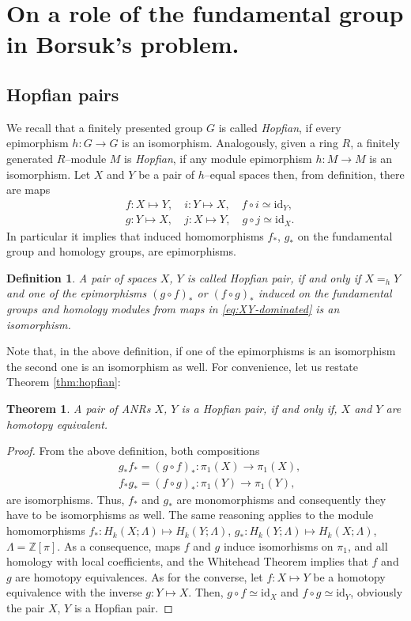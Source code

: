 \documentclass[reqno,12pt]{amsart}
\newtheorem*{theorem*}{Theorem}
\theoremstyle{ourremark}
\newtheorem{definition}[theorem]{Definition}
\numberwithin{equation}{section}
\numberwithin{theorem}{section}
\begin{document}
\section{On a role of the fundamental group in Borsuk's problem.}\label{sec:pi_1-role}

\subsection{Hopfian pairs} We recall that a finitely presented group $G$ is called {\em Hopfian}, if every epimorphism $h:G\longrightarrow G$ is an isomorphism.
Analogously, given a ring $R$, a finitely generated $R$--module $M$ is {\em Hopfian}, if any module epimorphism $h:M\longrightarrow M$ is an 
isomorphism. Let $X$ and $Y$ be a pair of $h$--equal spaces then, from definition, there are maps 
\begin{equation}\label{eq:XY-dominated}
\begin{split}
 & f:X\longmapsto Y,\quad i:Y\longmapsto X,\quad f\circ i\simeq \text{id}_Y,\\
 & g:Y\longmapsto X, \quad j:X\longmapsto Y, \quad g\circ j\simeq \text{id}_X.
\end{split} 
\end{equation}
In particular it implies that induced homomorphisms $f_\ast$, $g_\ast$ on the fundamental group and homology groups, are epimorphisms.
\begin{definition}\label{def:hopfian}
A pair of spaces $X$, $Y$ is called {\em Hopfian pair}, if and only if $X=_h Y$ and one of the epimorphisms $(g\circ f)_*$ or $(f\circ g)_*$ induced on the fundamental groups and homology modules from maps in \eqref{eq:XY-dominated} is an isomorphism.
\end{definition}
{\noindent} Note that, in the above definition, if one of the epimorphisms is an isomorphism the second one is an isomorphism as well. For convenience, let us restate Theorem \ref{thm:hopfian}:
\begin{theorem*}
A pair of ANRs $X$, $Y$ is a Hopfian pair, if and only if, $X$ and $Y$ are homotopy equivalent.
\end{theorem*}
\begin{proof}
 From the above definition, both compositions
 \[
 \begin{split}
  & g_* f_*=(g\circ f)_*:\pi_1(X)\longrightarrow \pi_1(X),\\
  & f_* g_*=(f\circ g)_*:\pi_1(Y)\longrightarrow \pi_1(Y),
 \end{split}
\]
are isomorphisms. Thus,  $f_*$ and $g_*$ are monomorphisms and consequently they have to be isomorphisms as well. The same reasoning applies to the module homomorphisms $f_*:H_k(X;\Lambda)\longmapsto H_k(Y;\Lambda)$, $g_*:H_k(Y;\Lambda)\longmapsto H_k(X;\Lambda)$, $\Lambda={\mathbb{Z}}[\pi]$. As a consequence, maps $f$ and $g$ induce isomorhisms on $\pi_1$, and all homology with local coefficients, and the Whitehead Theorem implies that $f$ and $g$ are homotopy equivalences. As for the converse, let $f:X\longmapsto Y$ be a homotopy equivalence with the inverse $g:Y\longmapsto X$. Then, $g\circ f\simeq \text{id}_X$ and $f\circ g\simeq \text{id}_Y$, obviously the pair $X$, $Y$ is a Hopfian pair.
\end{proof}
\end{document}
